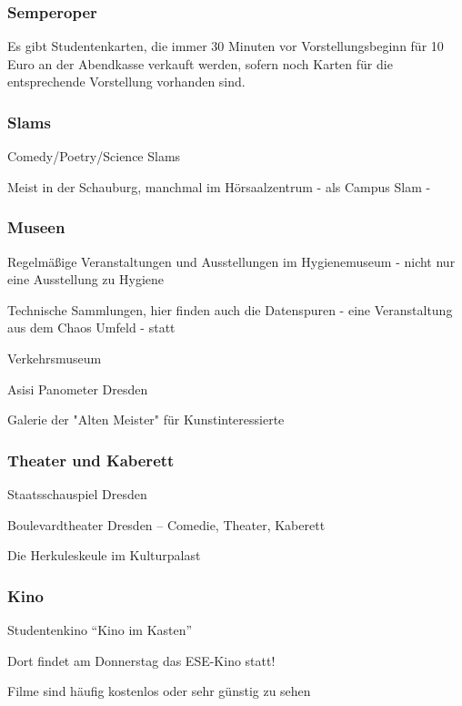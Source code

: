 \documentclass[a4paper,12pt]{report}
\begin{document}
\subsubsection{Semperoper}
\begin{itemize*}
	\item Es gibt Studentenkarten, die immer 30 Minuten vor Vorstellungsbeginn für 10 Euro an der Abendkasse verkauft werden, sofern noch Karten für die entsprechende Vorstellung vorhanden sind.
\end{itemize*}

\subsubsection{Slams}
\begin{itemize*}
	\item Comedy/Poetry/Science Slams
	\item Meist in der Schauburg, manchmal im Hörsaalzentrum - als Campus Slam -
\end{itemize*}

\subsubsection{Museen}
\begin{itemize*}
	\item Regelmäßige Veranstaltungen und Ausstellungen im Hygienemuseum - nicht nur eine Ausstellung zu Hygiene
	\item Technische Sammlungen, hier finden auch die Datenspuren - eine Veranstaltung aus dem Chaos Umfeld - statt
	\item Verkehrsmuseum 
	\item Asisi Panometer Dresden
	\item Galerie der "Alten Meister" für Kunstinteressierte
\end{itemize*}

\subsubsection{Theater und Kaberett}
\begin{itemize*}
	\item Staatsschauspiel Dresden
	\item Boulevardtheater Dresden -- Comedie, Theater, Kaberett
	\item Die Herkuleskeule im Kulturpalast
\end{itemize*}

\subsubsection{Kino}
\begin{itemize*}
	\item Studentenkino \enquote{Kino im Kasten}
	\item Dort findet am Donnerstag das ESE-Kino statt!
	\item Filme sind häufig kostenlos oder sehr günstig zu sehen
\end{itemize*}
\end{document}
